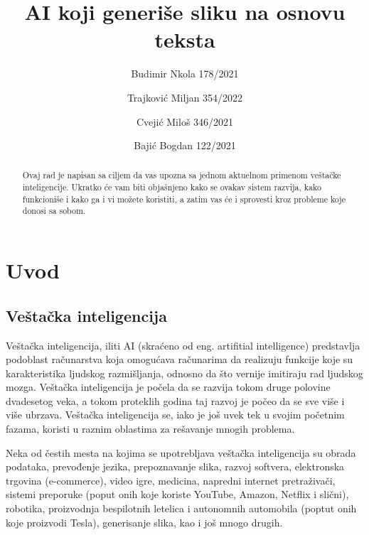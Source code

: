 \documentclass[12pt, letterpaper]{article}
\begin{document}
\title{AI koji generiše sliku na osnovu teksta}
\author{Budimir Nkola 178/2021\\ \and Trajković Miljan 354/2022 \and Cvejić Miloš 346/2021\\ \and Bajić Bogdan 122/2021}
\maketitle

\begin{abstract}
    Ovaj rad je napisan sa ciljem da vas upozna sa jednom aktuelnom primenom veštačke inteligencije. Ukratko će vam biti objašnjeno kako se ovakav sistem razvija, kako funkcioniše i kako ga i vi možete koristiti, a zatim vas će i sprovesti kroz probleme koje donosi sa sobom.
\end{abstract}
\begin{tableofcontents}
\end{tableofcontents}

\pagebreak 

\section{Uvod} 

\subsection*{Veštačka inteligencija} 

Veštačka inteligencija, iliti AI (skraćeno od eng. artifitial intelligence) predstavlja podoblast računarstva koja omogućava računarima da realizuju funkcije koje su karakteristika ljudskog razmišljanja, odnosno da što vernije imitiraju rad ljudskog mozga. Veštačka inteligencija je počela da se razvija tokom druge polovine dvadesetog veka, a tokom proteklih godina taj razvoj je počeo da se sve više i više ubrzava. Veštačka inteligencija se, iako je još uvek tek u svojim početnim fazama, koristi u raznim oblastima za rešavanje mnogih problema. \cite{kljucJedan} 

  

Neka od čestih mesta na kojima se upotrebljava veštačka inteligencija su obrada podataka, prevođenje jezika, prepoznavanje slika, razvoj softvera, elektronska trgovina (e-commerce), video igre, medicina, napredni internet pretraživači, sistemi preporuke (poput onih koje koriste YouTube, Amazon, Netflix i slični), robotika, proizvodnja bespilotnih letelica i autonomnih automobila (poptut onih koje proizvodi Tesla), generisanje slika, kao i još mnogo drugih.  
\end{document}
